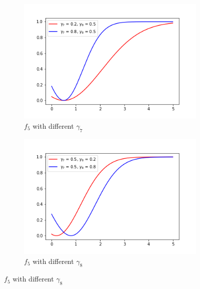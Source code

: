 \documentclass[a4paper,12pt,times,numbered,print,index]{report}
\numberwithin{equation}{section}
\begin{document}
\begin{figure}[!htbp]
	\centering
	\caption{$f_{5}\left(x_{t-1}^{\prime }\theta _{0},\gamma_{0}\right)$ with different $\gamma$}
	\begin{subfigure}[b]{0.44\linewidth}
		\includegraphics[width=\linewidth]{plots/scale_expshift_g7.png}
		\caption{$f_{5}$ with different $\gamma_{7}$}
		\label{param_g7}
	\end{subfigure}
	\begin{subfigure}[b]{0.44\linewidth}
		\includegraphics[width=\linewidth]{plots/scale_expshift_g8.png}
		\caption{$f_{5}$ with different $\gamma_{8}$}
		\label{param_g8}
	\end{subfigure}
	\label{exp1}
\end{figure}
\end{document}
